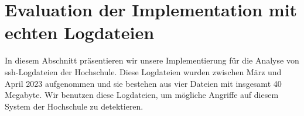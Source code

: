 \section{Evaluation der Implementation mit echten Logdateien}
In diesem Abschnitt präsentieren wir unsere Implementierung für die Analyse von \gls{ssh}-Logdateien der Hochschule. Diese Logdateien wurden zwischen März und April 2023 aufgenommen und sie bestehen aus vier Dateien mit insgesamt 40 Megabyte. Wir benutzen diese Logdateien, um mögliche Angriffe auf diesem System der Hochschule zu detektieren.



